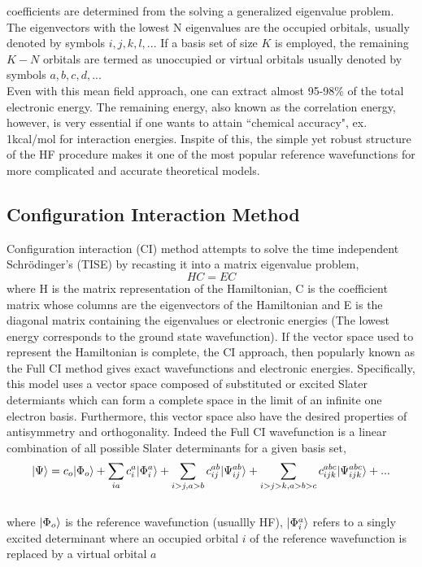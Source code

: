 coefficients are determined from the solving a generalized eigenvalue problem.
The eigenvectors with the lowest N eigenvalues are the occupied orbitals, usually 
denoted by symbols $i,j,k,l,..$. If a basis set of size $K$ is employed, the remaining $K-N$
orbitals are termed as unoccupied or virtual orbitals usually denoted by symbols $a,b,c,d,..$.
\\
Even with this mean field approach, one can extract almost 95-98\% of the total 
electronic energy. The remaining energy, also known as the correlation energy,
however, is very essential if one wants to attain ``chemical accuracy", ex.  
1kcal/mol for interaction energies. Inspite of this, the simple yet robust 
structure of the HF procedure makes it one of the most popular reference 
wavefunctions for more complicated and accurate theoretical models.
\subsection{Configuration Interaction Method}
Configuration interaction (CI) method attempts to solve the time independent 
Schr\"odinger's (TISE) by recasting it into a matrix eigenvalue problem, 
\begin{equation}
HC = EC
\end{equation}
where H is the matrix representation of the Hamiltonian, C is the coefficient matrix
whose columns are the eigenvectors of the Hamiltonian and E is the diagonal matrix 
containing the eigenvalues or electronic energies (The lowest energy corresponds to 
the ground state wavefunction). If the vector space used to represent the Hamiltonian 
is complete, the CI approach, then popularly known as the Full CI method gives exact 
wavefunctions and electronic energies. Specifically, this model uses a vector space 
composed of substituted or excited Slater determiants which can form a complete
space in the limit of an infinite one electron basis. Furthermore, this vector space 
also have the desired properties of antisymmetry and orthogonality. Indeed the Full 
CI wavefunction is a linear combination of all possible Slater determinants for a given basis set,
\\
\begin{equation}
| \Psi \rangle = c_o| \Phi_o \rangle + \sum_{ia}{c}_{i}^{a}| {\Phi}^a_i \rangle + \sum_{i>j,a>b}c_{ij}^{ab}| \Psi^{ab}_{ij} \rangle + \sum_{i>j>k,a>b>c}c_{ijk}^{abc}| \Psi^{abc}_{ijk} \rangle + ...
\end{equation}
\\
where $| \Phi_o \rangle$ is the reference wavefunction (usuallly HF), $| {\Phi}^a_i \rangle$ refers to a singly excited determinant where an occupied orbital $i$ of the reference wavefunction is replaced by a virtual orbital $a$
